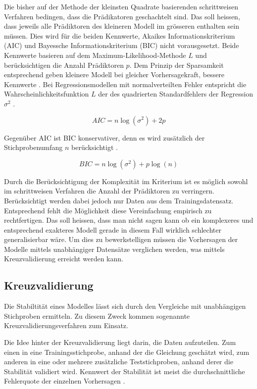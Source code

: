 Die bisher auf der Methode der kleinsten Quadrate basierenden schrittweisen Verfahren bedingen, dass die Prädikatoren geschachtelt sind. 
Das soll heissen, dass jeweils alle Prädiktoren des kleineren Modell im grösseren enthalten sein müssen. 
Dies wird für die  beiden Kennwerte, Akaikes Informationskriterium (AIC) und  Bayessche Informationskriterium (BIC) nicht vorausgesetzt. 
Beide Kennwerte basieren auf dem Maximum-Likelihood-Methode $L$ und  berücksichtigen die Anzahl Prädiktoren $p$. 
Dem Prinzip der Sparsamkeit entsprechend geben kleinere Modell bei gleicher Vorhersagekraft, bessere Kennwerte \cite[p. 509]{jacob2003applied}. 
Bei Regressionsmodellen mit normalverteilten Fehler entspricht die Wahrscheinlichkeitsfunktion $L$ der des quadrierten Standardfehlers der Regression $\sigma^2$ \cite[p. 169]{weakliem2004introduction}. 

\begin{equation}
AIC = n \log(\sigma^2) + 2p
\tag{AIC}
\end{equation}

Gegenüber AIC ist BIC konservativer, denn es wird zusätzlich der Stichprobenumfang $n$ berücksichtigt \cite[p. 169]{weakliem2004introduction}. 

\begin{equation}
BIC = n\log(\sigma^2) + p\log(n)
\tag{BIC}
\end{equation}

Durch die Berücksichtigung der Komplexität im Kriterium ist es möglich sowohl im schrittweisen Verfahren die Anzahl der Prädiktoren zu verringern.  Berücksichtigt werden dabei jedoch nur Daten aus dem Trainingsdatensatz. Entsprechend fehlt die Möglichkeit diese Vereinfachung empirisch zu rechtfertigen. Das soll heissen, dass man nicht sagen kann ob ein komplexeres und entsprechend exakteres Modell gerade in diesem Fall wirklich schlechter generalisierbar wäre. Um dies zu bewerkstelligen müssen die Vorhersagen der Modelle mittels unabhängiger Datensätze verglichen werden, was mittels Kreuzvalidierung erreicht werden kann. 

\subsection{Kreuzvalidierung}
Die Stabiltität eines Modelles lässt sich durch den Vergleiche mit unabhängigen Stichproben ermitteln.
Zu diesem Zweck kommen sogenannte Kreuzvalidierungsverfahren zum Einsatz.

Die Idee hinter der Kreuzvalidierung liegt darin, die Daten aufzuteilen. Zum einen in eine Trainingsstichprobe, anhand der die Gleichung geschätzt wird, zum anderen in eine oder mehrere zusätzliche Teststichproben, anhand derer die Stabilität validiert wird. Kennwert der Stabilität ist meist die durchschnittliche Fehlerquote der einzelnen Vorhersagen \cite[p. 3]{arlot2010survey}. 


